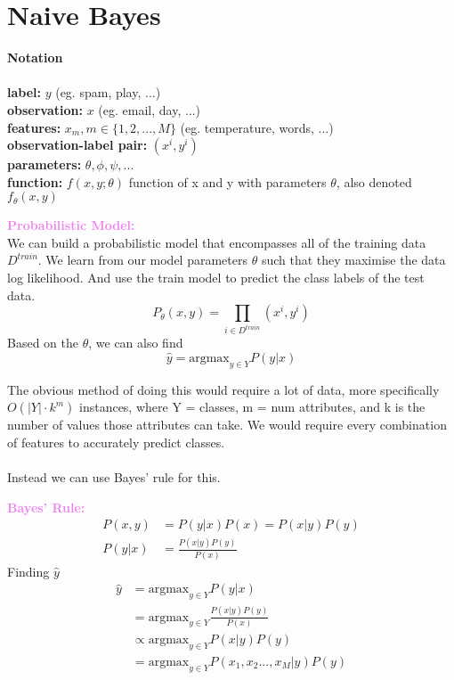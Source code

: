 \documentclass[a4paper,10pt]{article}
\begin{document}
\section*{Naive Bayes}
\textcolor{Periwinkle}{\textbf{Notation}}\\\\
\textbf{label:} $y$ (eg. spam, play, ...) \\
\textbf{observation:} $x$ (eg. email, day, ...)\\
\textbf{features:} $x_m, m \in \{1,2,...,M\}$ (eg. temperature, words, ...)\\
\textbf{observation-label pair:} $(x^{i}, y^{i})$ \\
\textbf{parameters:} $\theta, \phi, \psi, ...$ \\
\textbf{function:} $f(x,y;\theta)$ function of x and y with parameters $\theta$, also denoted $f_{\theta}(x,y)$
\begin{shaded}
\noindent \textcolor{Violet}{\textbf{Probabilistic Model:}}\\
We can build a probabilistic model that encompasses all of the training data $D^{train}$. We learn from our model parameters $\theta$ such that they maximise the data log likelihood. And use the train model to predict the class labels of the test data. 
\begin{equation*}
	P_{\theta}(x,y) = \prod_{i \in D^{train}}(x^{i}, y^{i})
\end{equation*}
Based on the $\theta$, we can also find 
\begin{equation*}
	\hat{y} = \text{argmax}_{y \in Y} P(y|x)
\end{equation*}
\end{shaded}
\noindent The obvious method of doing this would require a lot of data, more specifically $O(|Y|\cdot k^{m})$ instances, where Y = classes, m = num attributes, and k is the number of values those attributes can take. We would require every combination of features to accurately predict classes. \\\\
Instead we can use Bayes' rule for this. \\
\begin{shaded}
	\noindent \textcolor{Violet}{\textbf{Bayes' Rule:}}\\
	\begin{align*}
		P(x,y) &= P(y|x) P(x) = P(x|y)P(y) \\
		P(y|x) &= \frac{P(x|y)P(y)}{P(x)}
	\end{align*}
	Finding $\hat{y}$ 
	\begin{align*}
		\hat{y} &= \text{argmax}_{y \in Y}P(y|x) \\
		&= \text{argmax}_{y \in Y}\frac{P(x|y)P(y)}{P(x)} \\
		&\propto \text{argmax}_{y \in Y}P(x|y)P(y) \\
		&= \text{argmax}_{y \in Y}P(x_{1}, x_{2} ..., x_{M}|y)P(y)
	\end{align*}
\end{shaded}
\end{document}
